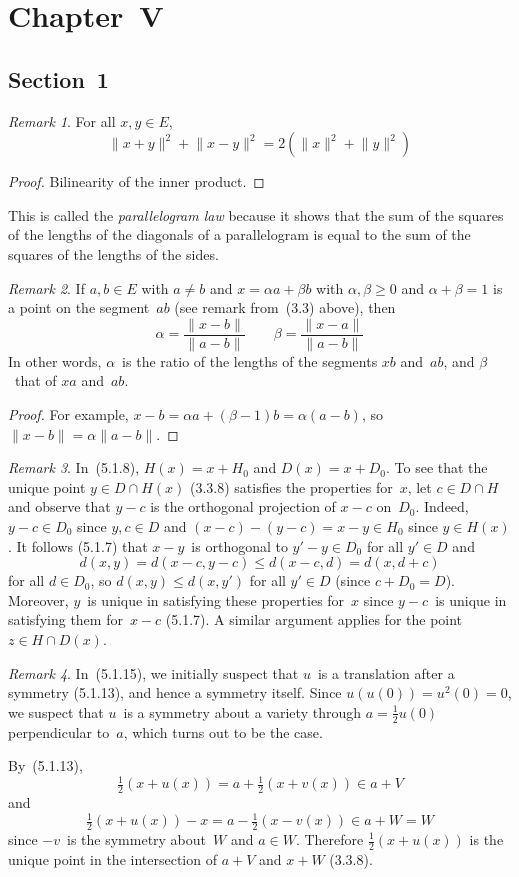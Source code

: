 \documentclass[letterpaper,12pt]{article}
\newcommand{\sect}{\cap}
\newcommand{\norm}[1]{\lVert{#1}\rVert}
\theoremstyle{definition}
\theoremstyle{remark}
\newtheorem*{rmk}{Remark}
\begin{document}
\section*{Chapter~V}
\subsection*{Section~1}
\begin{rmk}
For all \(x,y\in E\),
\[\norm{x+y}^2+\norm{x-y}^2=2\left(\norm{x}^2+\norm{y}^2\right)\]
\end{rmk}
\begin{proof}
Bilinearity of the inner product.
\end{proof}
\noindent This is called the \emph{parallelogram law} because it shows that the sum of the squares of the lengths of the diagonals of a parallelogram is equal to the sum of the squares of the lengths of the sides.

\begin{rmk}
If \(a,b\in E\) with \(a\ne b\) and \(x=\alpha a+\beta b\) with \(\alpha,\beta\ge 0\) and \(\alpha+\beta=1\) is a point on the segment~\(ab\) (see remark from~(3.3) above), then
\[\alpha=\frac{\norm{x-b}}{\norm{a-b}}\qquad\beta=\frac{\norm{x-a}}{\norm{a-b}}\]
In other words, \(\alpha\)~is the ratio of the lengths of the segments \(xb\) and~\(ab\), and \(\beta\)~that of \(xa\) and~\(ab\).
\end{rmk}
\begin{proof}
For example, \(x-b=\alpha a+(\beta-1)b=\alpha(a-b)\), so \(\norm{x-b}=\alpha\norm{a-b}\).
\end{proof}

\begin{rmk}
In~(5.1.8), \(H(x)=x+H_0\) and \(D(x)=x+D_0\). To see that the unique point \(y\in D\sect H(x)\) (3.3.8) satisfies the properties for~\(x\), let \(c\in D\sect H\) and observe that \(y-c\) is the orthogonal projection of \(x-c\) on~\(D_0\). Indeed, \(y-c\in D_0\) since \(y,c\in D\) and \((x-c)-(y-c)=x-y\in H_0\) since \(y\in H(x)\). It follows (5.1.7) that \(x-y\)~is orthogonal to \(y'-y\in D_0\) for all \(y'\in D\) and
\[d(x,y)=d(x-c,y-c)\le d(x-c,d)=d(x,d+c)\]
for all \(d\in D_0\), so \(d(x,y)\le d(x,y')\) for all \(y'\in D\) (since \(c+D_0=D\)). Moreover, \(y\)~is unique in satisfying these properties for~\(x\) since \(y-c\)~is unique in satisfying them for~\(x-c\) (5.1.7). A similar argument applies for the point \(z\in H\sect D(x)\).
\end{rmk}

\begin{rmk}
In~(5.1.15), we initially suspect that \(u\)~is a translation after a symmetry (5.1.13), and hence a symmetry itself. Since \(u(u(0))=u^2(0)=0\), we suspect that \(u\)~is a symmetry about a variety through \(a=\tfrac{1}{2}u(0)\) perpendicular to~\(a\), which turns out to be the case.

By~(5.1.13),
\[\tfrac{1}{2}(x+u(x))=a+\tfrac{1}{2}(x+v(x))\in a+V\]
and
\[\tfrac{1}{2}(x+u(x))-x=a-\tfrac{1}{2}(x-v(x))\in a+W=W\]
since \(-v\)~is the symmetry about~\(W\) and \(a\in W\). Therefore \(\tfrac{1}{2}(x+u(x))\) is the unique point in the intersection of \(a+V\) and \(x+W\) (3.3.8).
\end{rmk}
\end{document}
